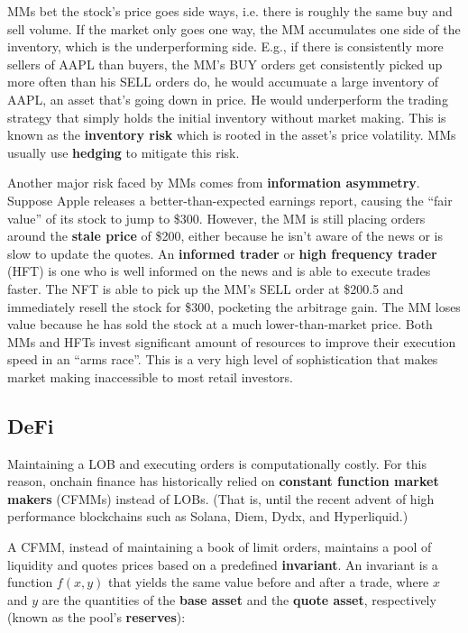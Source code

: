 \documentclass{article}
\begin{document}
MMs bet the stock's price goes side ways, i.e. there is roughly the same buy and sell volume. If the market only goes one way, the MM accumulates one side of the inventory, which is the underperforming side. E.g., if there is consistently more sellers of AAPL than buyers, the MM's BUY orders get consistently picked up more often than his SELL orders do, he would accumuate a large inventory of AAPL, an asset that's going down in price. He would underperform the trading strategy that simply holds the initial inventory without market making. This is known as the \textbf{inventory risk} which is rooted in the asset's price volatility. MMs usually use \textbf{hedging} to mitigate this risk.

Another major risk faced by MMs comes from \textbf{information asymmetry}. Suppose Apple releases a better-than-expected earnings report, causing the ``fair value'' of its stock to jump to \$300. However, the MM is still placing orders around the \textbf{stale price} of \$200, either because he isn't aware of the news or is slow to update the quotes. An \textbf{informed trader} or \textbf{high frequency trader} (HFT) is one who is well informed on the news and is able to execute trades faster. The NFT is able to pick up the MM's SELL order at \$200.5 and immediately resell the stock for \$300, pocketing the arbitrage gain. The MM loses value because he has sold the stock at a much lower-than-market price. Both MMs and HFTs invest significant amount of resources to improve their execution speed in an ``arms race''.\supercite{frequentbatchauctions} This is a very high level of sophistication that makes market making inaccessible to most retail investors.

\subsection{DeFi}

Maintaining a LOB and executing orders is computationally costly. For this reason, onchain finance has historically relied on \textbf{constant function market makers} (CFMMs) instead of LOBs. (That is, until the recent advent of high performance blockchains such as Solana, Diem, Dydx, and Hyperliquid.)

A CFMM, instead of maintaining a book of limit orders, maintains a pool of liquidity and quotes prices based on a predefined \textbf{invariant}. An invariant is a function $f(x, y)$ that yields the same value before and after a trade, where $x$ and $y$ are the quantities of the \textbf{base asset} and the \textbf{quote asset}, respectively (known as the pool's \textbf{reserves}):
\end{document}
